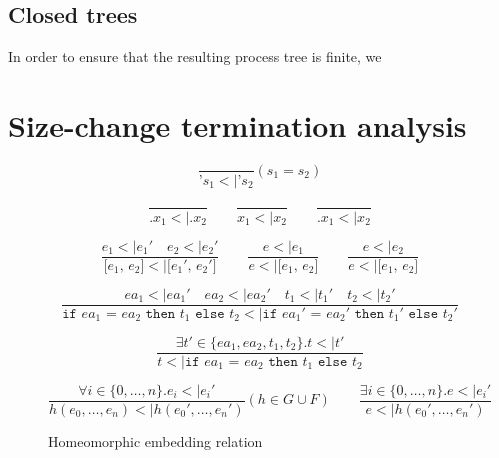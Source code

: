\documentclass[10pt]{../sigplanconf}
\newcommand{\nfrac}[2]{\frac{\displaystyle{#1}}{\displaystyle{#2}}}
\newcommand{\tagsc}[1]{\tag{\scshape #1}}
\begin{document}
\subsection{Closed trees}
In order to ensure that the resulting process tree is finite, we


\section{Size-change termination analysis}

\begin{figure}\centering
  \begin{equation}
    \nfrac{
    }{
      \texttt{'}s_1 <| \texttt{'}s_2
    } (s_1 = s_2) \tagsc{Atoms}
  \end{equation}

  \begin{equation}
    \nfrac{
    }{
      \texttt{.}x_1 <| \texttt{.}x_2
    }
    \qquad
    \nfrac{
    }{
      x_1 <| x_2
    }
    \qquad
    \nfrac{
    }{
      \texttt{.}x_1 <| x_2
    } \tagsc{Variables}
  \end{equation}

  \begin{equation}
    \nfrac{
      e_1 <| e_1'\quad e_2 <| e_2'
    }{
      \texttt{[$e_1$, $e_2$]} <| \texttt{[$e_1'$, $e_2'$]}
    }
    \qquad
    \nfrac{
      e <| e_1
    }{
      e <| \texttt{[$e_1$, $e_2$]}
    }
    \qquad
    \nfrac{
      e <| e_2
    }{
      e <| \texttt{[$e_1$, $e_2$]}
    }
    \tagsc{Cons}
  \end{equation}

  \begin{equation}
    \nfrac{
      ea_1 <| ea_1' \quad ea_2 <| ea_2' \quad t_1 <| t_1' \quad t_2 <| t_2'
    }{
      \texttt{if $ea_1$ = $ea_2$ then $t_1$ else $t_2$} <| \texttt{if $ea_1'$ = $ea_2'$ then $t_1'$ else $t_2'$}
    } \tagsc{If-A}
  \end{equation}

  \begin{equation}
    \nfrac{
      \exists t' \in \{ea_1, ea_2, t_1, t_2\}. t <| t'
    }{
      t <| \texttt{if $ea_1$ = $ea_2$ then $t_1$ else $t_2$}
    } \tagsc{If-B}
  \end{equation}

\begin{equation}
  \nfrac{
    \forall i \in \{0, \ldots, n\}. e_i <| e_i'
  }{
    h(e_0, \ldots, e_n) <| h(e_0', \ldots, e_n')
  } (h \in G \cup F)
  \qquad
  \nfrac{
    \exists i \in \{0, \ldots, n\}. e <| e_i'
  }{
    e <| h(e_0', \ldots, e_n')
  }
 \tagsc{Call}
\end{equation}

\caption{Homeomorphic embedding relation}
\label{fig:embedding}
\end{figure}
\end{document}
